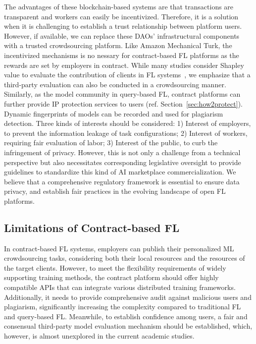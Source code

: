 The advantages of these blockchain-based systems are that transactions are transparent and workers can easily be incentivized.
Therefore, it is a solution when it is challenging to establish a trust relationship between platform users. 
However, if available, we can replace these DAOs' infrastructural components with a trusted crowdsourcing platform.
Like Amazon Mechanical Turk, the incentivized mechanisms is no nessary for contract-based FL platforms as the rewards are set by employers in contract.
While many studies consider Shapley value to evaluate the contribution of clients in FL systems~\cite{zhan2021survey}, we emphasize that a third-party evaluation can also be conducted in a crowdsourcing manner.
Similarly, as the model community in query-based FL, contract platforms can further provide IP protection services to users (ref. Section~\ref{sec:how2protect}). 
Dynamic fingerprints of models can be recorded and used for plagiarism detection.
Three kinds of interests should be considered: 1) Interest of employers, to prevent the information leakage of task configurations; 2) Interest of workers, requiring fair evaluation of labor; 3) Interest of the public, to curb the infringement of privacy.
However, this is not only a challenge from a technical perspective but also necessitates corresponding legislative oversight to provide guidelines to standardize this kind of AI marketplace commercialization.
We believe that a comprehensive regulatory framework is essential to ensure data privacy, and establish fair practices in the evolving landscape of open FL platforms.

\subsection{Limitations of Contract-based FL}
In contract-based FL systems, employers can publish their personalized ML crowdsourcing tasks, considering both their local resources and the resources of the target clients. 
However, to meet the flexibility requirements of widely supporting training methods, the contract platform should offer highly compatible APIs that can integrate various distributed training frameworks. 
Additionally, it needs to provide comprehensive audit against malicious users and plagiarism, significantly increasing the complexity compared to traditional FL and query-based FL.
Meanwhile, to establish confidence among users, a fair and consensual third-party model evaluation mechanism should be established, which, however, is almost unexplored in the current academic studies.

